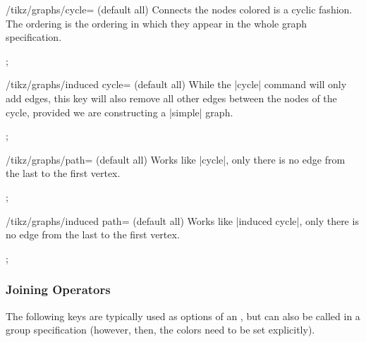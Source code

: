 \begin{key}{/tikz/graphs/cycle= (default all)}
  Connects the nodes colored  is a cyclic fashion. The
  ordering is the ordering in which they appear in the whole graph
  specification.
\begin{codeexample}[]
\tikz {};    
\end{codeexample}
\end{key}

\begin{key}{/tikz/graphs/induced cycle= (default all)}
  While the |cycle| command will only add edges, this key will also
  remove all other edges between the nodes of the cycle, provided we
  are constructing a |simple| graph.
\begin{codeexample}[]
\tikz {};    
\end{codeexample}
\end{key}
  
\begin{key}{/tikz/graphs/path= (default all)}
  Works like |cycle|, only there is no edge from the last to the first
  vertex. 
\begin{codeexample}[]
\tikz {};    
\end{codeexample}
\end{key}
\begin{key}{/tikz/graphs/induced path= (default all)}
  Works like |induced cycle|, only there is no edge from the last to the first
  vertex. 
\begin{codeexample}[]
\tikz {};    
\end{codeexample}
\end{key}


\subsubsection{Joining Operators}

The following keys are typically used as options of an , but can also be called in a group specification
(however, then, the colors need to be set explicitly).

